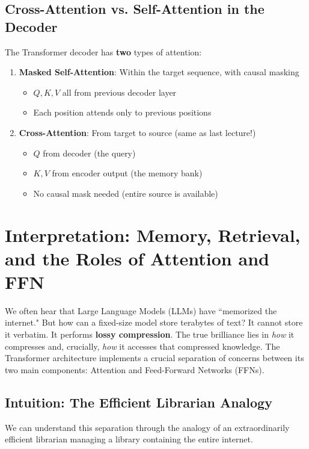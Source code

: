 \documentclass{article}
\begin{document}
\subsection{Cross-Attention vs. Self-Attention in the Decoder}

The Transformer decoder has \textbf{two} types of attention:

\begin{enumerate}
\item \textbf{Masked Self-Attention}: Within the target sequence, with causal masking
\begin{itemize}
\item $Q, K, V$ all from previous decoder layer
\item Each position attends only to previous positions
\end{itemize}

\item \textbf{Cross-Attention}: From target to source (same as last lecture!)
\begin{itemize}
\item $Q$ from decoder (the query)
\item $K, V$ from encoder output (the memory bank)
\item No causal mask needed (entire source is available)
\end{itemize}
\end{enumerate}

\section{Interpretation: Memory, Retrieval, and the Roles of Attention and FFN}

We often hear that Large Language Models (LLMs) have ``memorized the internet." But how can a fixed-size model store terabytes of text? It cannot store it verbatim. It performs \textbf{lossy compression}. The true brilliance lies in \emph{how} it compresses and, crucially, \emph{how} it accesses that compressed knowledge. The Transformer architecture implements a crucial separation of concerns between its two main components: Attention and Feed-Forward Networks (FFNs).

\subsection{Intuition: The Efficient Librarian Analogy}

We can understand this separation through the analogy of an extraordinarily efficient librarian managing a library containing the entire internet.
\end{document}
